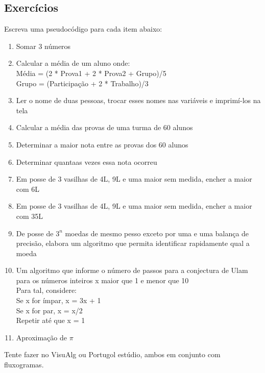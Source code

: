 \documentclass[12pt,a4paper]{article} %
\begin{document}
\subsection{Exercícios}
Escreva uma pseudocódigo para cada item abaixo:
\begin{enumerate}
\item Somar 3 números
\item Calcular a média de um aluno onde:\\Média = (2 * Prova1 + 2 * Prova2 + Grupo)/5\\Grupo = (Participação + 2 * Trabalho)/3
\item Ler o nome de duas pessoas, trocar esses nomes nas variáveis e imprimí-los na tela
\item Calcular a média das provas de uma turma de 60 alunos
\item Determinar a maior nota entre as provas dos 60 alunos
\item Determinar quantaas vezes essa nota ocorreu
\item Em posse de 3 vasilhas de 4L, 9L e uma maior sem medida, encher a maior com 6L
\item Em posse de 3 vasilhas de 4L, 9L e uma maior sem medida, encher a maior com 35L
\item De posse de $3^{n}$ moedas de mesmo pesso exceto por uma e uma balança de precisão, elabora um algoritmo que permita identificar rapidamente qual a moeda
\item Um algoritmo que informe o número de passos para a conjectura de Ulam para os números inteiros x maior que 1 e menor que 10\\Para tal, considere:\\Se x for ímpar, x = 3x + 1\\Se x for par, x = x/2\\Repetir até que x = 1
\item Aproximação de $\pi$
\end{enumerate}
Tente fazer no VisuAlg ou Portugol estúdio, ambos em conjunto com fluxogramas.
\end{document}
